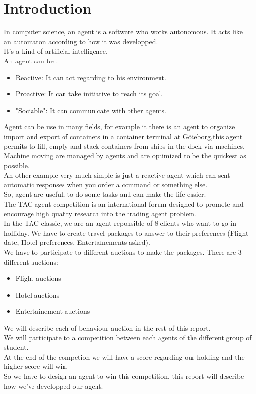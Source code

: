 \section*{Introduction}
In computer science, an agent is a software who works autonomous. It acts like an automaton according to how it was developped.\\
 It's a kind of artificial intelligence.\\
  An agent can be :\\
\begin{itemize}
	\item Reactive: It can act regarding to his environment.
	\item Proactive: It can take initiative to reach its goal.
	\item "Sociable": It can communicate with other agents.
\end{itemize}
Agent can be use in many fields, for example it there is an agent to organize import and export of containers in a container terminal at Göteborg,this agent permits to fill, empty and stack containers from ships in the dock via machines. Machine moving are managed by agents and are optimized to be the quickest as possible.\\
An other example very much simple is just a reactive agent which can sent automatic responses when you order a command or something else.\\
So, agent are usefull to do some tasks and can make the life easier.\\
The TAC agent competition is an international forum designed to promote and encourage high quality research into the trading agent problem.\\
In the TAC classic, we are an agent reponsible of 8 clients who want to go in holliday. We have to create travel packages to answer to their preferences (Flight date, Hotel preferences, Entertainements asked).\\
We have to participate to different auctions to make the packages. There are 3 different auctions:\\
\begin{itemize}
\item Flight auctions
\item Hotel auctions
\item Entertainement auctions
\end{itemize}
We will describe each of behaviour auction in the rest of this report.\\
We will participate to a competition between each agents of the different group of student.\\
At the end of the competion we will have a score regarding our holding and the higher score will win.\\
So we have to design an agent to win this competition, this report will describe how we've developped our agent.
